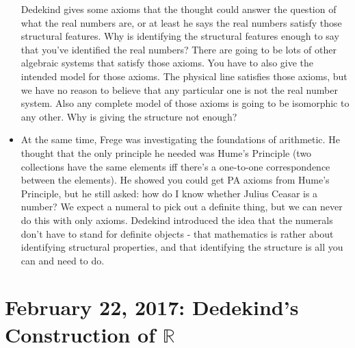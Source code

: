 \documentclass[12pt]{article}
\theoremstyle{definition}
\begin{document}
\begin{itemize}
        Dedekind gives some axioms that the thought could answer the question
        of what the real numbers are, or at least he says the real numbers
        satisfy those structural features. Why is identifying the structural
        features enough to say that you've identified the real numbers? There
        are going to be lots of other algebraic systems that satisfy those
        axioms. You have to also give the intended model for those axioms. The
        physical line satisfies those axioms, but we have no reason to believe
        that any particular one is not the real number system. Also any
        complete model of those axioms is going to be isomorphic to any other.
        Why is giving the structure not enough?
    \item
        At the same time, Frege was investigating the foundations of
        arithmetic. He thought that the only principle he needed was Hume's
        Principle (two collections have the same elements iff there's a
        one-to-one correspondence between the elements). He showed you could
        get PA axioms from Hume's Principle, but he still asked: how do I know
        whether Julius Ceasar is a number? We expect a numeral to pick out a
        definite thing, but we can never do this with only axioms. Dedekind
        introduced the idea that the numerals don't have to stand for definite
        objects - that mathematics is rather about identifying structural
        properties, and that identifying the structure is all you can and need
        to do. 
\end{itemize}

\section{February 22, 2017: Dedekind's Construction of $\mathbb{R}$}
\end{document}
